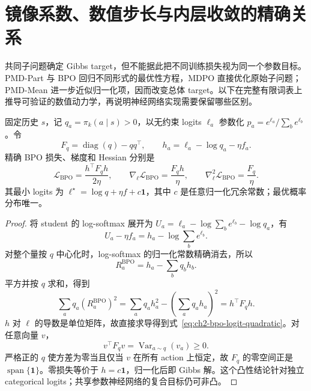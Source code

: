 \section{镜像系数、数值步长与内层收敛的精确关系}
\label{sec:ch2-eta-step-audit}

共同子问题确定 Gibbs target，但不能据此把不同训练损失视为同一个参数目标。PMD-Part 与 BPO 回归不同形式的最优性方程，MDPO 直接优化原始子问题；PMD-Mean 进一步近似归一化项，因而改变总体 target。以下在完整有限词表上推导可验证的数值动力学，再说明神经网络实现需要保留哪些区别。

\begin{proposition}
\label{prop:ch2-bpo-logit-quadratic}
固定历史 $s$，记 $q_a=\pi_k(a\mid s)>0$，以无约束 logits $\ell_a$ 参数化 $p_a=e^{\ell_a}/\sum_b e^{\ell_b}$。令
\[
 F_q=\operatorname{diag}(q)-qq^\top,\qquad
 h_a=\ell_a-\log q_a-\eta f_a.
\]
精确 BPO 损失、梯度和 Hessian 分别是
\begin{equation}
 \mathcal L_{\mathrm{BPO}}=\frac{h^\top F_qh}{2\eta},\qquad
 \nabla_\ell\mathcal L_{\mathrm{BPO}}=\frac{F_qh}{\eta},\qquad
 \nabla_\ell^2\mathcal L_{\mathrm{BPO}}=\frac{F_q}{\eta}.
 \label{eq:ch2-bpo-logit-quadratic}
\end{equation}
其最小 logits 为 $\ell^\star=\log q+\eta f+c\mathbf1$，其中 $c$ 是任意归一化冗余常数；最优概率分布唯一。
\end{proposition}

\begin{proof}
将 student 的 log-softmax 展开为 $U_a=\ell_a-\log\sum_b e^{\ell_b}-\log q_a$，有
\[
 U_a-\eta f_a=h_a-\log\sum_b e^{\ell_b}.
\]
对整个量按 $q$ 中心化时，log-softmax 的归一化常数精确消去，所以
\[
 R_a^{\mathrm{BPO}}=h_a-\sum_bq_bh_b.
\]
平方并按 $q$ 求和，得到
\[
 \sum_aq_a(R_a^{\mathrm{BPO}})^2
 =\sum_aq_ah_a^2-\left(\sum_aq_ah_a\right)^2=h^\top F_qh.
\]
$h$ 对 $\ell$ 的导数是单位矩阵，故直接求导得到式~\eqref{eq:ch2-bpo-logit-quadratic}。对任意向量 $v$，
\[
 v^\top F_qv=\operatorname{Var}_{a\sim q}(v_a)\ge0.
\]
严格正的 $q$ 使方差为零当且仅当 $v$ 在所有 action 上恒定，故 $F_q$ 的零空间正是 $\operatorname{span}\{\mathbf1\}$。零损失等价于 $h=c\mathbf1$，归一化后即 Gibbs 解。这个凸性结论针对独立 categorical logits；共享参数神经网络的复合目标仍可非凸。
\end{proof}

